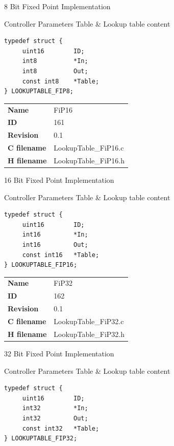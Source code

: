 8 Bit Fixed Point Implementation

\begin{XtoCtabular}{Controller Parameters}
Table & Lookup table content\tabularnewline
\hline
\end{XtoCtabular}

\begin{lstlisting}
typedef struct {
     uint16        ID;
     int8          *In;
     int8          Out;
     const int8    *Table;
} LOOKUPTABLE_FIP8;
\end{lstlisting}

\ifdefined \AddTestReports
{}
\fi
{}
\nopagebreak[0]
\begin{tabular}{l l}
\textbf{Name} & FiP16 \tabularnewline
\textbf{ID} & 161 \tabularnewline
\textbf{Revision} & 0.1 \tabularnewline
\textbf{C filename} & LookupTable\_FiP16.c \tabularnewline
\textbf{H filename} & LookupTable\_FiP16.h \tabularnewline
\end{tabular}
\vspace{1ex}

16 Bit Fixed Point Implementation

\begin{XtoCtabular}{Controller Parameters}
Table & Lookup table content\tabularnewline
\hline
\end{XtoCtabular}

\begin{lstlisting}
typedef struct {
     uint16        ID;
     int16         *In;
     int16         Out;
     const int16   *Table;
} LOOKUPTABLE_FIP16;
\end{lstlisting}

\ifdefined \AddTestReports
{}
\fi
{}
\nopagebreak[0]
\begin{tabular}{l l}
\textbf{Name} & FiP32 \tabularnewline
\textbf{ID} & 162 \tabularnewline
\textbf{Revision} & 0.1 \tabularnewline
\textbf{C filename} & LookupTable\_FiP32.c \tabularnewline
\textbf{H filename} & LookupTable\_FiP32.h \tabularnewline
\end{tabular}
\vspace{1ex}

32 Bit Fixed Point Implementation

\begin{XtoCtabular}{Controller Parameters}
Table & Lookup table content\tabularnewline
\hline
\end{XtoCtabular}

\begin{lstlisting}
typedef struct {
     uint16        ID;
     int32         *In;
     int32         Out;
     const int32   *Table;
} LOOKUPTABLE_FIP32;
\end{lstlisting}

\ifdefined \AddTestReports
{}
\fi
